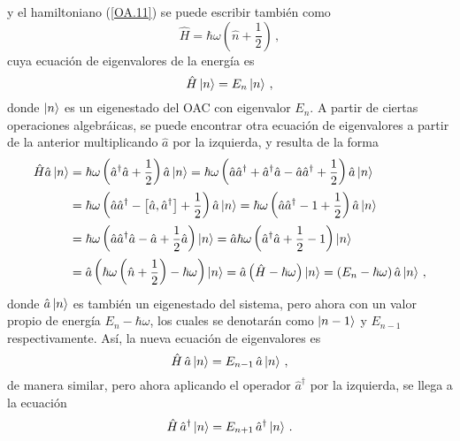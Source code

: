 y el hamiltoniano (\ref{OA.11}) se puede escribir también como
\begin{equation}
  \label{OA.13}
  \hat{H} = \hbar \omega \left(\hat{n} + \frac{1}{2}\right)\,,
\end{equation}
cuya ecuación de eigenvalores de la energía es
\begin{equation}
  \label{OA.14}
  \hat{H} \ket{n} = E_n\ket{n} \,,
\end{equation}
donde $\ket{n}$ es un eigenestado del OAC con eigenvalor $E_n$. A partir de ciertas operaciones algebráicas, se puede encontrar otra ecuación de eigenvalores a partir de la anterior multiplicando $\hat{a}$ por la izquierda, y resulta de la forma
\begin{align*}
  \hat{H} \hat{a}\ket{n} & = \hbar\omega\left(\hat{a}^{\dagger}\hat{a}+\frac{1}{2}\right)\hat{a}\ket{n} = \hbar\omega\left(\hat{a}\hat{a}^{\dagger}+\hat{a}^{\dagger}\hat{a}-\hat{a}\hat{a}^{\dagger}+\frac{1}{2}\right)\hat{a}\ket{n} \\
                         & = \hbar\omega\left(\hat{a}\hat{a}^{\dagger}-\left[\hat{a},\hat{a}^{\dagger}\right]+\frac{1}{2}\right)\hat{a}\ket{n} = \hbar\omega\left(\hat{a}\hat{a}^{\dagger}-1+\frac{1}{2}\right)\hat{a}\ket{n}          \\
                         & = \hbar\omega\left(\hat{a}\hat{a}^{\dagger}\hat{a}-\hat{a}+\frac{1}{2}\hat{a}\right)\ket{n} = \hat{a}\hbar\omega\left(\hat{a}^{\dagger}\hat{a}+\frac{1}{2}-1\right)\ket{n}                                  \\
                         & = \hat{a}\left(\hbar\omega\left(\hat{n}+\frac{1}{2}\right)-\hbar\omega\right)\ket{n} = \hat{a}\left(\hat{H}-\hbar\omega\right)\ket{n} = \left(E_{n}-\hbar\omega\right)\hat{a}\ket{n}\,,
\end{align*}
donde $\hat{a}\ket{n}$ es también un eigenestado del sistema, pero ahora con un valor propio de energía $E_n - \hbar\omega$, los cuales se denotarán como $\ket{n-1}$ y $E_{n-1}$ respectivamente. Así, la nueva ecuación de eigenvalores es
\begin{equation}
  \label{OA.15}
  \hat{H}\, \hat{a}\ket{n} = E_{n-1}\, \hat{a}\ket{n}\,,
\end{equation} %
de manera similar, pero ahora aplicando el operador $\hat{a}^{\dagger}$ por la izquierda, se llega a la ecuación
\begin{equation}
  \label{OA.16}
  \hat{H} \,\hat{a}^{\dagger}\ket{n} = E_{n+1}\, \hat{a}^{\dagger}\ket{n}\,.
\end{equation}
